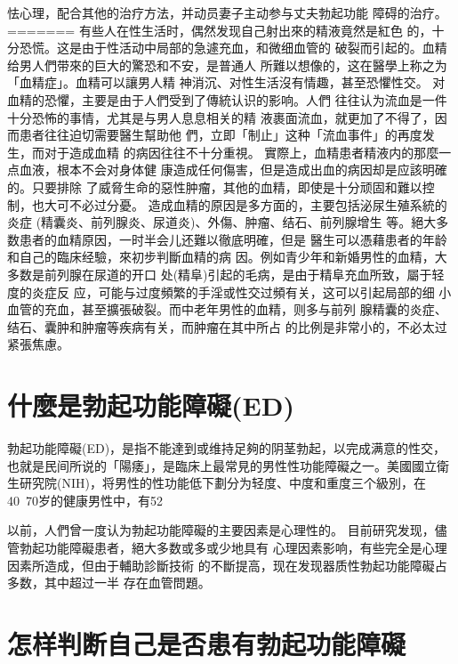 \documentclass[12pt,UTF8]{ctexbook}
\begin{document}
怯心理，配合其他的治疗方法，并动员妻子主动参与丈夫勃起功能
障碍的治疗。
=======
有些人在性生活时，偶然发现自己射出來的精液竟然是紅色
的，十分恐慌。这是由于性活动中局部的急遽充血，和微细血管的
破裂而引起的。血精给男人們带來的巨大的驚恐和不安，是普通人
所難以想像的，这在醫學上称之为「血精症」。血精可以讓男人精
神消沉、对性生活沒有情趣，甚至恐懼性交。
对血精的恐懼，主要是由于人們受到了傳統认识的影响。人們
往往认为流血是一件十分恐怖的事情，尤其是与男人息息相关的精
液裹面流血，就更加了不得了，因而患者往往迫切需要醫生幫助他
們，立即「制止」这种「流血事件」的再度发生，而对于造成血精
的病因往往不十分重視。
實際上，血精患者精液内的那麼一点血液，根本不会对身体健
康造成任何傷害，但是造成出血的病因却是应該明確的。只要排除
了威脅生命的惡性肿瘤，其他的血精，即使是十分顽固和難以控
制，也大可不必过分憂。
造成血精的原因是多方面的，主要包括泌尿生殖系統的炎症
(精囊炎、前列腺炎、尿道炎)、外傷、肿瘤、结石、前列腺增生
等。絕大多数患者的血精原因，一时半会儿还難以徹底明確，但是
醫生可以憑藉患者的年龄和自己的臨床经驗，來初步判斷血精的病
因。例如青少年和新婚男性的血精，大多数是前列腺在尿道的开口
处(精阜)引起的毛病，是由于精阜充血所致，屬于轻度的炎症反
应，可能与过度頻繁的手淫或性交过頻有关，这可以引起局部的细
小血管的充血，甚至擴張破裂。而中老年男性的血精，则多与前列
腺精囊的炎症、结石、囊肿和肿瘤等疾病有关，而肿瘤在其中所占
的比例是非常小的，不必太过紧張焦慮。

\section{什麼是勃起功能障礙(ED)}

勃起功能障礙(ED)，是指不能達到或维持足夠的阴茎勃起，以完成满意的性交，也就是民间所说的「陽痿」，是臨床上最常見的男性性功能障礙之一。美國國立衛生研究院(NIH)，将男性的性功能低下劃分为轻度、中度和重度三个級別，在40~70岁的健康男性中，有52%

以前，人們曾一度认为勃起功能障礙的主要因素是心理性的。
目前研究发现，儘管勃起功能障礙患者，絕大多数或多或少地具有
心理因素影响，有些完全是心理因素所造成，但由于輔助診斷技術
的不斷提高，现在发现器质性勃起功能障礙占多数，其中超过一半
存在血管問題。

\section{怎样判断自己是否患有勃起功能障礙}
\end{document}
